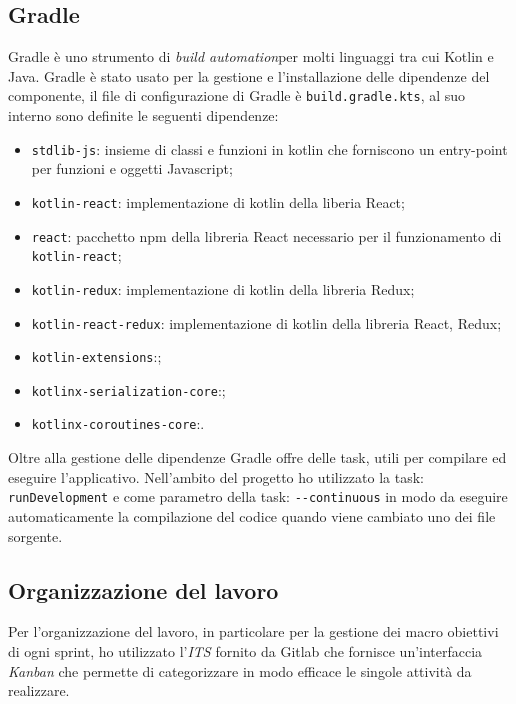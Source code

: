 \subsection{Gradle}
Gradle è uno strumento di \emph{build automation}\glosp per molti linguaggi tra cui Kotlin e Java. Gradle è stato usato per la gestione e l'installazione delle dipendenze del componente, il file di configurazione di Gradle è \verb|build.gradle.kts|, al suo interno sono definite le seguenti dipendenze:
\begin{itemize}
	\item \verb|stdlib-js|: insieme di classi e funzioni in kotlin che forniscono un entry-point per funzioni e oggetti Javascript;
	
	\item \verb|kotlin-react|: implementazione di kotlin della liberia React;
	
	\item \verb|react|: pacchetto npm della libreria React necessario per il funzionamento di \verb|kotlin-react|;
	
	\item \verb|kotlin-redux|: implementazione di kotlin della libreria Redux;
	
	\item \verb|kotlin-react-redux|: implementazione di kotlin della libreria React, Redux;
	
	\item \verb|kotlin-extensions|:;
	
	\item \verb|kotlinx-serialization-core|:;
	
	\item \verb|kotlinx-coroutines-core|:.
\end{itemize}
\noindent
Oltre alla gestione delle dipendenze Gradle offre delle task, utili per compilare ed eseguire l'applicativo. Nell'ambito del progetto ho utilizzato la task: \verb|runDevelopment| e come parametro della task: \verb|--continuous| in modo da eseguire automaticamente la compilazione del codice quando viene cambiato uno dei file sorgente.

\subsection{Organizzazione del lavoro}
Per l'organizzazione del lavoro, in particolare per la gestione dei macro obiettivi di ogni sprint, ho utilizzato l'\emph{ITS} fornito da Gitlab che fornisce un'interfaccia \emph{Kanban} che permette di categorizzare in modo efficace le singole attività da realizzare.























